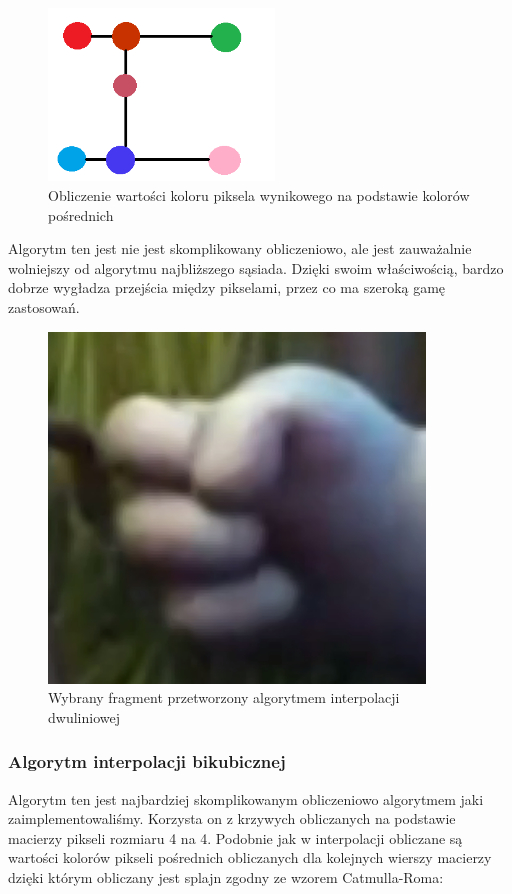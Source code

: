 \documentclass[twoside]{projektInzynierskiMS}
\begin{document}
\begin{figure}[h]
\centering
\includegraphics[width=6cm]{Interpolation3.png}
\caption{Obliczenie wartości koloru piksela wynikowego na podstawie kolorów pośrednich}
\end{figure}

Algorytm ten jest nie jest skomplikowany obliczeniowo, ale jest zauważalnie wolniejszy od algorytmu najbliższego sąsiada. Dzięki swoim właściwością, bardzo dobrze wygładza przejścia między pikselami, przez co ma szeroką gamę zastosowań.

\begin{figure}[h]
\centering
\includegraphics[width=10cm]{HandInterpolation.png}
\caption{Wybrany fragment przetworzony algorytmem interpolacji dwuliniowej}
\label{fig:handInterpolation}
\end{figure}

\subsubsection{Algorytm interpolacji bikubicznej}
Algorytm ten jest najbardziej skomplikowanym obliczeniowo algorytmem jaki zaimplementowaliśmy. Korzysta on z krzywych obliczanych na podstawie macierzy pikseli rozmiaru 4 na 4. Podobnie jak w interpolacji obliczane są wartości kolorów pikseli pośrednich obliczanych dla kolejnych wierszy macierzy dzięki którym obliczany jest splajn zgodny ze wzorem Catmulla-Roma:
\end{document}
